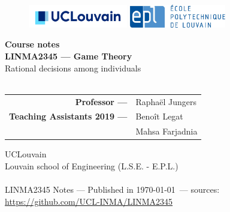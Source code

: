 \ifx \globalmark \undefined %

\else
\fi



\begin{titlepage}
\begin{center}



\vfill

\begin{figure}[!ht]
  \centering
  \includegraphics[height = 1cm]{_UCLouvain_Logo_Impression_Positif_CMJN.jpg}
  \hfill
  \includegraphics[height = 1cm]{Logo_EPL.jpg}
\end{figure}







{ \bfseries Course notes }
\hrulefill\\[0.5cm]
\large{\textbf{LINMA2345 --- Game Theory}\\
Rational decisions among individuals} \\
\hrulefill\\[0.5cm]


\vfill
\vfill
\parbox[H][][c]{\textwidth}
	{
	\begin{tabular}{rl}
	\textbf{Professor ---} &  Rapha\"el Jungers \\
	\textbf{Teaching Assistants 2019 ---} 	 &	Beno\^it Legat \\
		     &	Mahsa Farjadnia
	\end{tabular}
	}\par




UCLouvain\\
Louvain school of Engineering (L.S.E. - E.P.L.)\\
$\,$\\
\tiny{LINMA2345 Notes --- Published in \monthyeardate\today $\,$ --- sources: \url{https://github.com/UCL-INMA/LINMA2345}}
\end{center}

\end{titlepage}







